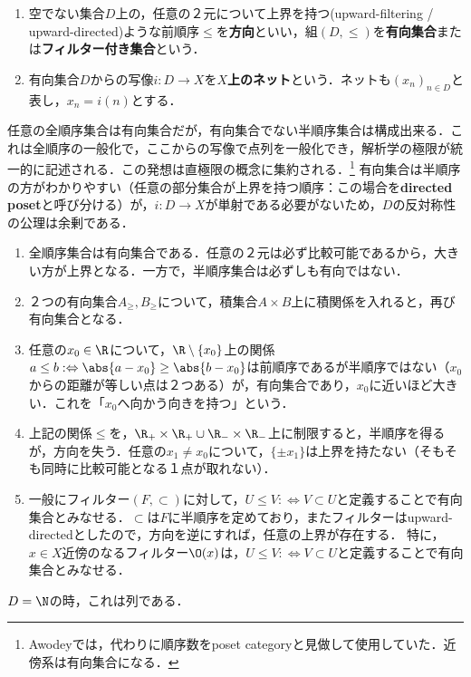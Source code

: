 \documentclass[uplatex,dvipdfmx]{jsreport}
\begin{document}
\begin{definition}\mbox{}
    \begin{enumerate}
        \item 空でない集合$D$上の，任意の２元について上界を持つ(upward-filtering / upward-directed)ような前順序$\le$を\textbf{方向}といい，組$(D,\le)$を\textbf{有向集合}または\textbf{フィルター付き集合}という．
        \item 有向集合$D$からの写像$i:D\to X$を\textbf{$X$上のネット}という．ネットも$(x_n)_{n\in D}$と表し，$x_n=i(n)$とする．
    \end{enumerate}
\end{definition}
\begin{remarks}
    任意の全順序集合は有向集合だが，有向集合でない半順序集合は構成出来る．これは全順序の一般化で，ここからの写像で点列を一般化でき，解析学の極限が統一的に記述される．この発想は直極限の概念に集約される．\footnote{Awodeyでは，代わりに順序数をposet categoryと見做して使用していた．近傍系は有向集合になる．}
    有向集合は半順序の方がわかりやすい（任意の部分集合が上界を持つ順序：この場合を\textbf{directed poset}と呼び分ける）が，$i:D\to X$が単射である必要がないため，$D$の反対称性の公理は余剰である．
\end{remarks}
\begin{example}[有向集合の例]\mbox{}\label{exp-directed-sets}
    \begin{enumerate}
        \item 全順序集合は有向集合である．任意の２元は必ず比較可能であるから，大きい方が上界となる．一方で，半順序集合は必ずしも有向ではない．
        \item ２つの有向集合$A_\ge,B_\ge$について，積集合$A\times B$上に積関係を入れると，再び有向集合となる．
        \item 任意の$x_0\in\R$について，$\R\setminus\{x_0\}$上の関係$a\le b:\Leftrightarrow\abs{a-x_0}\ge\abs{b-x_0}$は前順序であるが半順序ではない（$x_0$からの距離が等しい点は２つある）が，有向集合であり，$x_0$に近いほど大きい．これを「$x_0$へ向かう向きを持つ」という．
        \item 上記の関係$\le$を，$\R_+\times\R_+\cup\R_-\times\R_-$上に制限すると，半順序を得るが，方向を失う．任意の$x_1\ne x_0$について，$\{\pm x_1\}$は上界を持たない（そもそも同時に比較可能となる１点が取れない）．
        \item 一般にフィルター$(F,\subset)$に対して，$U\le V:\Leftrightarrow V\subset U$と定義することで有向集合とみなせる．$\subset$は$F$に半順序を定めており，またフィルターはupward-directedとしたので，方向を逆にすれば，任意の上界が存在する．
        特に，$x\in X$近傍のなるフィルター$\O(x)$は，$U\le V:\Leftrightarrow V\subset U$と定義することで有向集合とみなせる．
    \end{enumerate}
\end{example}
\begin{example}[ネットの例]
    $D=\N$の時，これは列である．
\end{example}
\end{document}
